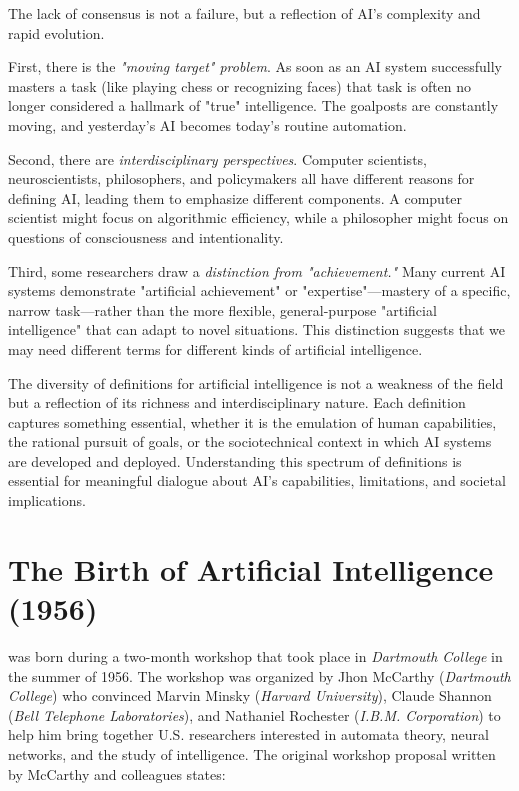 \documentclass{tufte-handout}
\begin{document}
The lack of consensus is not a failure, but a reflection of AI's complexity and rapid evolution.

First, there is the \textit{"moving target" problem}.  As soon as an AI system successfully masters a task (like playing chess or recognizing faces) that task is often no longer considered a hallmark of "true" intelligence. The goalposts are constantly moving, and yesterday's AI becomes today's routine automation.

Second, there are \textit{interdisciplinary perspectives}.  Computer scientists, neuroscientists, philosophers, and policymakers all have different reasons for defining AI, leading them to emphasize different components. A computer scientist might focus on algorithmic efficiency, while a philosopher might focus on questions of consciousness and intentionality.

Third, some researchers draw a \textit{distinction from "achievement."}  Many current AI systems demonstrate "artificial achievement" or "expertise"—mastery of a specific, narrow task—rather than the more flexible, general-purpose "artificial intelligence" that can adapt to novel situations. This distinction suggests that we may need different terms for different kinds of artificial intelligence.

The diversity of definitions for artificial intelligence is not a weakness of the field but a reflection of its richness and interdisciplinary nature. Each definition captures something essential, whether it is the emulation of human capabilities, the rational pursuit of goals, or the sociotechnical context in which AI systems are developed and deployed. Understanding this spectrum of definitions is essential for meaningful dialogue about AI's capabilities, limitations, and societal implications.



\section{The Birth of Artificial Intelligence (1956)}

 was born during a two-month workshop that took place in \textit{Dartmouth College} in the summer of 1956.  The workshop was organized by Jhon McCarthy (\textit{Dartmouth College})   who convinced Marvin Minsky (\textit{Harvard University}), Claude Shannon (\textit{Bell Telephone Laboratories}), and Nathaniel Rochester (\textit{I.B.M. Corporation}) to help him bring together U.S. researchers interested in automata theory, neural networks, and the study of intelligence.  The original workshop proposal written by McCarthy and colleagues states: 
\end{document}
